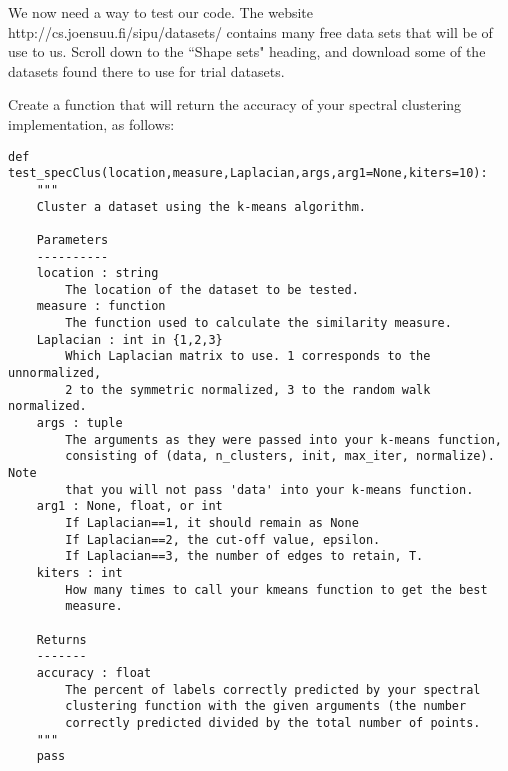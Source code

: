 We now need a way to test our code.  The website http://cs.joensuu.fi/sipu/datasets/ contains many free data sets that will be of use to us.  Scroll down to the ``Shape sets" heading, and download some of the datasets found there to use for trial datasets.
\begin{problem}
Create a function that will return the accuracy of your spectral clustering implementation, as follows:
\begin{lstlisting}
def test_specClus(location,measure,Laplacian,args,arg1=None,kiters=10):
    """
    Cluster a dataset using the k-means algorithm.

    Parameters
    ----------
    location : string
        The location of the dataset to be tested.
    measure : function
        The function used to calculate the similarity measure.
    Laplacian : int in {1,2,3}
        Which Laplacian matrix to use. 1 corresponds to the unnormalized,
        2 to the symmetric normalized, 3 to the random walk normalized.
    args : tuple
        The arguments as they were passed into your k-means function,
        consisting of (data, n_clusters, init, max_iter, normalize). Note
        that you will not pass 'data' into your k-means function.
    arg1 : None, float, or int
        If Laplacian==1, it should remain as None
        If Laplacian==2, the cut-off value, epsilon.
        If Laplacian==3, the number of edges to retain, T.
    kiters : int
        How many times to call your kmeans function to get the best
        measure.

    Returns
    -------
    accuracy : float
        The percent of labels correctly predicted by your spectral
        clustering function with the given arguments (the number
        correctly predicted divided by the total number of points.
    """
    pass
\end{lstlisting}
\end{problem}
